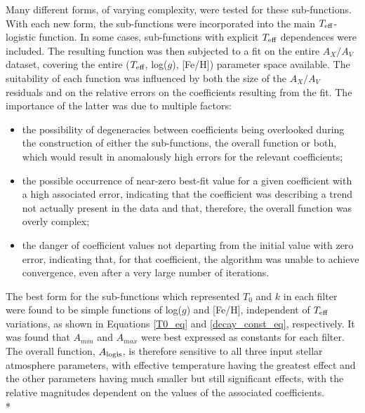\documentclass[12pt, a4paper]{report}
\begin{document}
Many different forms, of varying complexity, were tested for these sub-functions. With each new form, the sub-functions were incorporated into the main $T_{\textnormal{eff}}$-logistic function. In some cases, sub-functions with explicit $T_{\textnormal{eff}}$ dependences were included. The resulting function was then subjected to a fit on the entire $A_{X}/A_{V}$ dataset, covering the entire ($T_{\textnormal{eff}}$,  log($g$), [Fe/H]) parameter space available. The suitability of each function was influenced by both the size of the $A_{X}/A_{V}$ residuals and on the relative errors on the coefficients resulting from the fit. The importance of the latter was due to multiple factors:

\begin{itemize}
\item the possibility of degeneracies between coefficients being overlooked during the construction of either the sub-functions, the overall function or both, which would result in anomalously high errors for the relevant coefficients;
\item the possible occurrence of near-zero best-fit value for a given coefficient with a high associated error, indicating that the coefficient was describing a trend not actually present in the data and that, therefore, the overall function was overly complex;
\item the danger of coefficient values not departing from the initial value with zero error, indicating that, for that coefficient, the algorithm was unable to achieve convergence, even after a very large number of iterations.
\end{itemize}

The best form for the sub-functions which represented $T_{0}$ and $k$ in each filter were found to be simple functions of log($g$) and [Fe/H], independent of $T_{\textnormal{eff}}$ variations, as shown in Equations \ref{T0_eq} and \ref{decay_const_eq}, respectively. It was found that $A_{min}$ and $A_{max}$ were best expressed as constants for each filter. The overall function, $A_{\textnormal{logis}}$, is therefore sensitive to all three input stellar atmosphere parameters, with effective temperature having the greatest effect and the other parameters having much smaller but still significant effects, with the relative magnitudes dependent on the values of the associated coefficients.\\*
\end{document}

